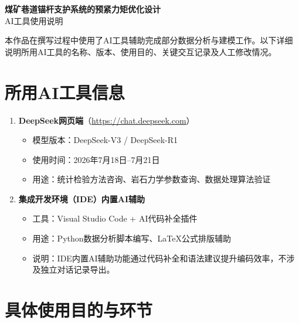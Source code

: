 \documentclass[12pt,a4paper]{article}
\begin{document}
\begin{center}
    {\LARGE\bfseries 煤矿巷道锚杆支护系统的预紧力矩优化设计}\\[1em]
    {\large AI工具使用说明}
\end{center}

\vspace{1em}

本作品在撰写过程中使用了AI工具辅助完成部分数据分析与建模工作。以下详细说明所用AI工具的名称、版本、使用目的、关键交互记录及人工修改情况。

\section{所用AI工具信息}

\begin{enumerate}
    \item \textbf{DeepSeek网页端}（\url{https://chat.deepseek.com}）
    \begin{itemize}
        \item 模型版本：DeepSeek-V3 / DeepSeek-R1
        \item 使用时间：2026年7月18日--7月21日
        \item 用途：统计检验方法咨询、岩石力学参数查询、数据处理算法验证
    \end{itemize}

    \item \textbf{集成开发环境（IDE）内置AI辅助}
    \begin{itemize}
        \item 工具：Visual Studio Code + AI代码补全插件
        \item 用途：Python数据分析脚本编写、LaTeX公式排版辅助
        \item 说明：IDE内置AI辅助功能通过代码补全和语法建议提升编码效率，不涉及独立对话记录导出。
    \end{itemize}
\end{enumerate}

\section{具体使用目的与环节}
\end{document}
